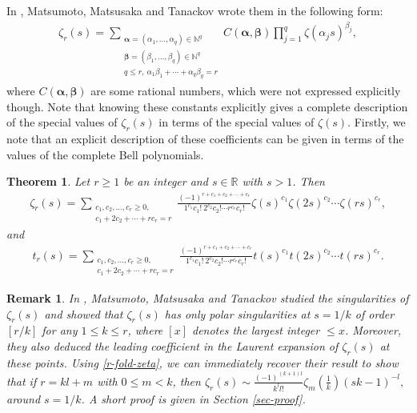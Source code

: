 \documentclass[12pt]{amsart}
\newcommand{\N}{{\mathbb N}}
\newcommand{\R}{{\mathbb R}}
\newtheorem{thm}{Theorem}
\newtheorem{rmk}{Remark}
\begin{document}
In \cite[eq. 2.13]{MMT}, Matsumoto, Matsusaka and Tanackov  wrote them in the following form:
\begin{align}\label{Matsumoto-zeta}
\zeta_r(s)=\sum_{\substack{{\bm{\alpha}}=(\alpha_1, \ldots,  \alpha_q)\in \N^q\\ {\bm{\beta}}=(\beta_1, \ldots,  \beta_q)\in \N^q \\ q\leq r, \ \alpha_1\beta_1+\cdots+\alpha_q\beta_q=r}}C({\bm \alpha}, {\bm \beta})\prod_{j=1}^{q}\zeta(\alpha_j s)^{\beta_j},
\end{align}
where $C({\bm \alpha}, {\bm \beta})$ are some rational numbers, which were not expressed explicitly though. Note that knowing these constants explicitly gives a complete description of the special values of $\zeta_r(s)$ in terms of the special values of $\zeta(s)$. Firstly, we note that an explicit description of these coefficients can be given in terms of the values of the complete Bell polynomials. 


\begin{thm}\label{main-thm}
Let $r\geq 1$ be an integer and $s\in \R$ with $s>1$. Then
\begin{align}\label{r-fold-zeta}
\zeta_r(s)=\sum_{ \substack{c_1,c_2, \ldots,c_r \geq 0, \\c_1+2c_2+\cdots+rc_r=r}}\frac{(-1)^{r+c_1+c_2+\cdots+c_r}}{1^{c_1}c_1! \ 2^{c_2}c_2!\cdots r^{c_r}c_r!}\zeta(s)^{c_1}\zeta(2s)^{c_2}\cdots\zeta(rs)^{c_r},
\end{align}
and 
\begin{align}\label{r-fold-t}
t_r(s)=\sum_{ \substack{c_1,c_2, \ldots,c_r \geq 0, \\c_1+2c_2+\cdots+rc_r=r}}\frac{(-1)^{r+c_1+c_2+\cdots+c_r}}{1^{c_1}c_1! \ 2^{c_2}c_2!\cdots r^{c_r}c_r!}t(s)^{c_1}t(2s)^{c_2}\cdots t(rs)^{c_r}.
\end{align}
\end{thm}

\begin{rmk}\label{rmk-MMT}\rm
 In \cite[Theorem 4.2, 4.3]{MMT}, Matsumoto, Matsusaka and Tanackov studied the singularities of $\zeta_r(s)$ and showed that $\zeta_r(s)$ has only polar singularities at $s=1/k$ of order $[r/k]$ for any $1\leq k\leq r$, where $[x]$ denotes the largest integer $ \le x$. Moreover, they also deduced the leading coefficient in the Laurent expansion of $\zeta_r(s)$ at these points. Using \eqref{r-fold-zeta}, we can immediately recover their result to show that if $r=kl+m$ with $0 \le m <k$, then 
 $
 \zeta_r(s) \sim \frac{(-1)^{(k+1)l}}{k^l l!}\zeta_m\left(\frac{1}{k}\right) (sk-1)^{-l},
 $
 around $s=1/k$. A short proof is given in Section \ref{sec-proof}.
\end{rmk}
\end{document}
